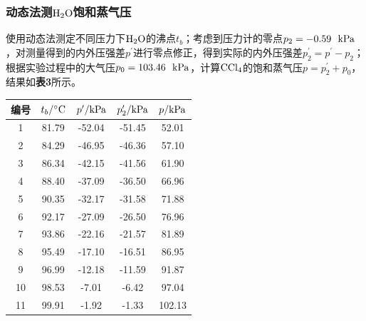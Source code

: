 \documentclass[12pt]{article}
\begin{document}
\subsubsection{动态法测$\rm H_{2}O$饱和蒸气压}
使用动态法测定不同压力下$\rm H_{2}O$的沸点$t_{b}$；考虑到压力计的零点$p_{2}=-0.59\ \ {\rm kPa}$，对测量得到的内外压强差$p^{\prime}$进行零点修正，得到实际的内外压强差$p_{2}^{\prime}=p^{\prime}-p_{2}$；根据实验过程中的大气压$p_{0}=103.46\ \ {\rm kPa}$，计算$\rm CCl_{4}$的饱和蒸气压$ p=p^{\prime}_{2}+p_{0}$，结果如\textbf{表3}所示。
 \begin{table}[h]
	\centering
	\begin{tabular}{ccccc}
		\toprule
		编号 & $t_{b}/{\rm ^{\circ}C}$& $p^{\prime}/{\rm kPa}$ & $p_{2}^{\prime}/{\rm kPa}$ & $p/{\rm kPa}$  \\
		\midrule
		1  & 81.79 & -52.04 & -51.45 & 52.01  \\
		2  & 84.29 & -46.95 & -46.36 & 57.10  \\
		3  & 86.34 & -42.15 & -41.56 & 61.90  \\
		4  & 88.40 & -37.09 & -36.50 & 66.96  \\
		5  & 90.35 & -32.17 & -31.58 & 71.88  \\
		6  & 92.17 & -27.09 & -26.50 & 76.96  \\
		7  & 93.86 & -22.16 & -21.57 & 81.89  \\
		8  & 95.49 & -17.10 & -16.51 & 86.95  \\
		9  & 96.99 & -12.18 & -11.59 & 91.87  \\
		10 & 98.53 & -7.01  & -6.42  & 97.04  \\
		11 & 99.91 & -1.92  & -1.33  & 102.13 \\
		\bottomrule
	\end{tabular}
\end{table}
\par
\end{document}
